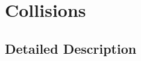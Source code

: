 \hypertarget{group____collision}{\section{Collisions}
\label{group____collision}
}


\subsection{Detailed Description}
